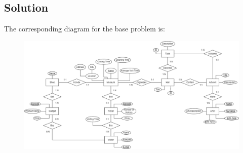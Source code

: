 \subsection*{Solution}
The corresponding diagram for the base problem is:
\begin{figure}[H]
    \centering
    \includegraphics[width=1.00\linewidth]{images/er1.png}
\end{figure}
